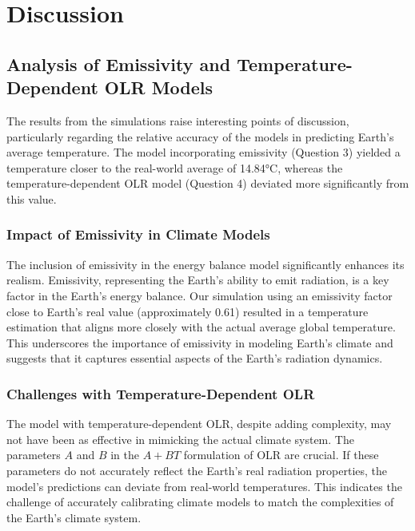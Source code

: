 \documentclass[12pt]{article}
\begin{document}
\section{Discussion}

\subsection{Analysis of Emissivity and Temperature-Dependent OLR Models}


The results from the simulations raise interesting points of discussion,
particularly regarding the relative accuracy of the models
in predicting Earth's average temperature.
The model incorporating emissivity (Question 3) yielded
a temperature closer to the real-world average of 14.84°C,
whereas the temperature-dependent OLR model (Question 4)
deviated more significantly from this value.

\subsubsection{Impact of Emissivity in Climate Models}
The inclusion of emissivity in the energy balance model significantly
enhances its realism. Emissivity, representing the Earth's ability to emit
 radiation, is a key factor in the Earth's energy balance.
 Our simulation using an emissivity factor close to Earth's real value
 (approximately 0.61) resulted in a temperature estimation that aligns
  more closely with the actual average global temperature.
  This underscores the importance of emissivity in modeling Earth's climate
  and suggests that it captures essential aspects of the Earth's radiation
   dynamics.

\subsubsection{Challenges with Temperature-Dependent OLR}
The model with temperature-dependent OLR, despite adding complexity,
may not have been as effective in mimicking the actual climate system.
The parameters \( A \) and \( B \) in the \( A + BT \) formulation of OLR
are crucial. If these parameters do not accurately reflect the Earth's real
radiation properties,
the model's predictions can deviate from real-world temperatures.
This indicates the challenge of accurately calibrating climate models
to match the complexities of the Earth's climate system.
\end{document}
